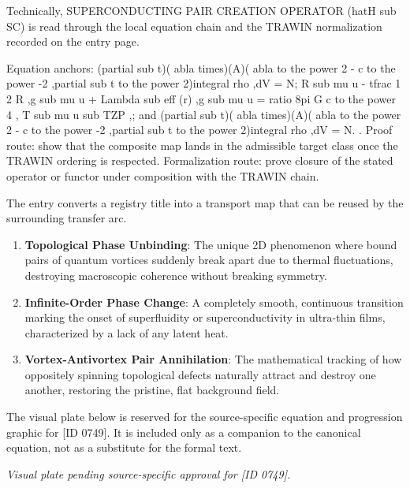 Technically, SUPERCONDUCTING PAIR CREATION OPERATOR (hatH sub SC) is read through the local equation chain and the TRAWIN normalization recorded on the entry page.

Equation anchors: (partial sub t)( abla times)(A)( abla to the power 2 - c to the power -2 ,partial sub t to the power 2)integral rho ,dV = N; R sub mu u - tfrac 1 2 R ,g sub mu u + Lambda sub eff (r) ,g sub mu u = ratio 8pi G c to the power 4 , T sub mu u sub TZP ,; and (partial sub t)( abla times)(A)( abla to the power 2 - c to the power -2 ,partial sub t to the power 2)integral rho ,dV = N. . Proof route: show that the composite map lands in the admissible target class once the TRAWIN ordering is respected. Formalization route: prove closure of the stated operator or functor under composition with the TRAWIN chain.

The entry converts a registry title into a transport map that can be reused by the surrounding transfer arc.
\endgroup

\begin{enumerate}[leftmargin=1.6em,itemsep=6pt,topsep=4pt]
\item \textbf{Topological Phase Unbinding}: The unique 2D phenomenon where bound pairs of quantum vortices suddenly break apart due to thermal fluctuations, destroying macroscopic coherence without breaking symmetry.
\item \textbf{Infinite-Order Phase Change}: A completely smooth, continuous transition marking the onset of superfluidity or superconductivity in ultra-thin films, characterized by a lack of any latent heat.
\item \textbf{Vortex-Antivortex Pair Annihilation}: The mathematical tracking of how oppositely spinning topological defects naturally attract and destroy one another, restoring the pristine, flat background field.
\end{enumerate}

\begingroup\footnotesize\sloppy
The visual plate below is reserved for the source-specific equation and progression graphic for [ID 0749]. It is included only as a companion to the canonical equation, not as a substitute for the formal text.
\par\endgroup
\begingroup\footnotesize\itshape
Visual plate pending source-specific approval for [ID 0749].
\par\endgroup

